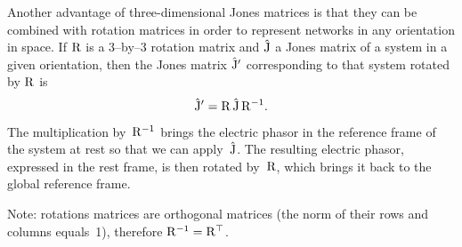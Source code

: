 Another advantage of three-dimensional Jones matrices is that they can be combined with rotation matrices in order to represent networks in any orientation in space.
If $\mathrm{R}$ is a 3--by--3 rotation matrix and $\hat{\mathrm{J}}$ a Jones matrix of a system in a given orientation,
then the Jones matrix $\hat{\mathrm{J}}'$ corresponding to that system rotated by $\mathrm{R}$ is
\begin{equation}
    \hat{\mathrm{J}}' = \mathrm{R} \, \hat{\mathrm{J}} \, \mathrm{R}^{-1}
    \text{.}
    \label{eq:jones_rotation_using_inverse}
\end{equation}
The multiplication by~$\mathrm{R}^{-1}$ brings the electric phasor in the reference frame of the system at rest so that we can apply~$\hat{\mathrm{J}}$.
The resulting electric phasor, expressed in the rest frame, is then rotated by~$\mathrm{R}$, which brings it back to the global reference frame.

Note: rotations matrices are orthogonal matrices (the norm of their rows and columns equals~1), therefore $\mathrm{R}^{-1} = \mathrm{R}^\top$.



